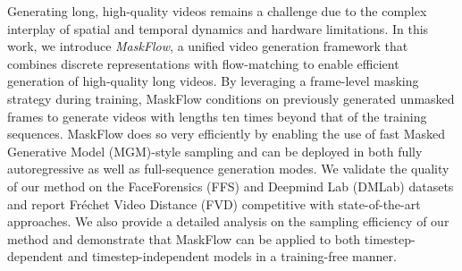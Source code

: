  Generating long, high-quality videos remains a challenge due to the complex interplay of spatial and temporal dynamics and hardware limitations. In this work, we introduce \textit{MaskFlow}, a unified video generation framework that combines discrete representations with flow-matching to enable efficient generation of high-quality long videos. By leveraging a frame-level masking strategy during training, MaskFlow conditions on previously generated unmasked frames to generate videos with lengths ten times beyond that of the training sequences. MaskFlow does so very efficiently by enabling the use of fast Masked Generative Model (MGM)-style sampling and can be deployed in both fully autoregressive as well as full-sequence generation modes. We validate the quality of our method on the FaceForensics (FFS) and Deepmind Lab (DMLab) datasets and report Fréchet Video Distance (FVD) competitive with state-of-the-art approaches. We also provide a detailed analysis on the sampling efficiency of our method and demonstrate that MaskFlow can be applied to both timestep-dependent and timestep-independent models in a training-free manner.

